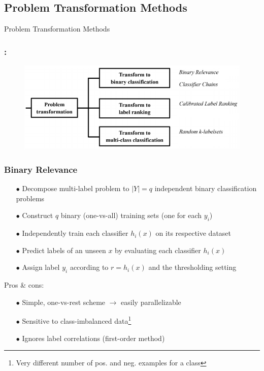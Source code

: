 \documentclass{beamer}
\begin{document}
\subsection{Problem Transformation Methods}
\begin{frame}
\Huge{\centerline{Problem Transformation Methods}}
\end{frame}
\begin{frame}
\frametitle{\insertsection : \insertsubsection}
\begin{figure}
\begin{center}
\includegraphics[scale = 0.7]{images/pt.png}
\end{center}
\end{figure}
\end{frame}
\begin{frame}
\frametitle{Binary Relevance}

\begin{itemize}
\item[$\bullet$] Decompose multi-label problem to $|Y|=q$ independent binary classification problems
\item[$\bullet$] Construct $q$ binary (one-vs-all) training sets (one for each $y_i$)
\item[$\bullet$] Independently train each classifier $h_i(x)$ on its respective dataset

\item[$\bullet$] Predict labels of an unseen $x$ by evaluating each classifier $h_i(x)$
\item[$\bullet$] Assign label $y_i$ according to $r = h_i(x)$ and the
  thresholding setting 
\end{itemize}

Pros \& cons:
\begin{itemize}
\item[$\bullet$] Simple, one-vs-rest scheme $\rightarrow$ easily parallelizable
\item[$\bullet$] Sensitive to class-imbalanced data\footnote{Very different
    number of pos. and neg. examples for a class}
\item[$\bullet$] Ignores label correlations (first-order method)
\end{itemize}

\end{frame}
\end{document}
